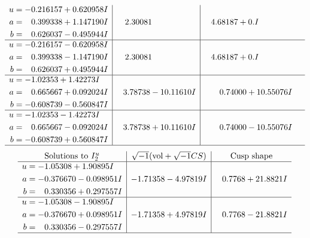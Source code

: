 \documentclass[1p]{elsarticle_modified}
\theoremstyle{definition}
\newcommand{\I}{\sqrt{-1}}
\begin{document}
$$\begin{array}{c|c|c}
\begin{aligned}
u &= -0.216157 + 0.620958 I \\
a &= \phantom{-}0.399338 + 1.147190 I \\
b &= \phantom{-}0.626037 - 0.495944 I\end{aligned}
 & \phantom{-}2.30081\phantom{ +0.000000I} & \phantom{-}4.68187 + 0. I\phantom{ +0.000000I} \\ \hline\begin{aligned}
u &= -0.216157 - 0.620958 I \\
a &= \phantom{-}0.399338 - 1.147190 I \\
b &= \phantom{-}0.626037 + 0.495944 I\end{aligned}
 & \phantom{-}2.30081\phantom{ +0.000000I} & \phantom{-}4.68187 + 0. I\phantom{ +0.000000I} \\ \hline\begin{aligned}
u &= -1.02353 + 1.42273 I \\
a &= \phantom{-}0.665667 + 0.092024 I \\
b &= -0.608739 - 0.560847 I\end{aligned}
 & \phantom{-}3.78738 - 10.11610 I & \phantom{-}0.74000 + 10.55076 I \\ \hline\begin{aligned}
u &= -1.02353 - 1.42273 I \\
a &= \phantom{-}0.665667 - 0.092024 I \\
b &= -0.608739 + 0.560847 I\end{aligned}
 & \phantom{-}3.78738 + 10.11610 I & \phantom{-}0.74000 - 10.55076 I\\
 \hline 
 \end{array}$$\newpage$$\begin{array}{c|c|c}  
\text{Solutions to }I^u_{2}& \I (\text{vol} + \sqrt{-1}CS) & \text{Cusp shape}\\
 \hline 
\begin{aligned}
u &= -1.05308 + 1.90895 I \\
a &= -0.376670 - 0.098951 I \\
b &= \phantom{-}0.330356 + 0.297557 I\end{aligned}
 & -1.71358 - 4.97819 I & \phantom{-}0.7768 + 21.8821 I \\ \hline\begin{aligned}
u &= -1.05308 - 1.90895 I \\
a &= -0.376670 + 0.098951 I \\
b &= \phantom{-}0.330356 - 0.297557 I\end{aligned}
 & -1.71358 + 4.97819 I & \phantom{-}0.7768 - 21.8821 I\\
 \hline 
 \end{array}$$\newpage\newpage\renewcommand{\arraystretch}{1}
\end{document}
